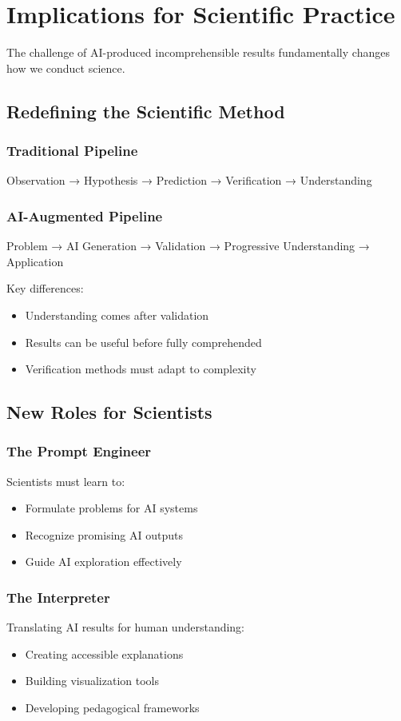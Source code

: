 \documentclass[11pt,a4paper]{article}
\begin{document}
\section{Implications for Scientific Practice}

The challenge of AI-produced incomprehensible results fundamentally changes how we conduct science.

\subsection{Redefining the Scientific Method}

\subsubsection{Traditional Pipeline}
Observation → Hypothesis → Prediction → Verification → Understanding

\subsubsection{AI-Augmented Pipeline}
Problem → AI Generation → Validation → Progressive Understanding → Application

Key differences:
\begin{itemize}
\item Understanding comes after validation
\item Results can be useful before fully comprehended
\item Verification methods must adapt to complexity
\end{itemize}

\subsection{New Roles for Scientists}

\subsubsection{The Prompt Engineer}
Scientists must learn to:
\begin{itemize}
\item Formulate problems for AI systems
\item Recognize promising AI outputs
\item Guide AI exploration effectively
\end{itemize}

\subsubsection{The Interpreter}
Translating AI results for human understanding:
\begin{itemize}
\item Creating accessible explanations
\item Building visualization tools
\item Developing pedagogical frameworks
\end{itemize}
\end{document}
